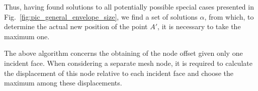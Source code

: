 \documentclass[
11pt,%
tightenlines,%
twoside,%
onecolumn,%
nofloats,%
nobibnotes,%
nofootinbib,%
superscriptaddress,%
noshowpacs,%
centertags]%
{revtex4-2}
\begin{document}
Thus, having found solutions to all potentially possible special
cases presented in Fig.~\ref{fig:pic_general_envelope_size}, we find
a set of solutions $\alpha$, from which, to determine the actual new
position of the point $A'$, it is necessary to take the maximum one.

The above algorithm concerns the obtaining of the node offset given only one incident face.
When considering a separate mesh node, it is required to calculate the displacement of this node relative to each incident face and choose the maximum among these displacements.
\end{document}
